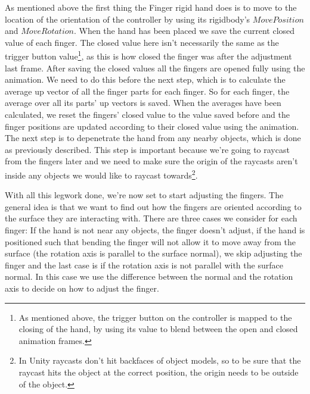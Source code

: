 As mentioned above the first thing the Finger rigid hand does is to move to the location of the orientation of the controller by using its rigidbody's $MovePosition$ and $MoveRotation$. When the hand has been placed we save the current closed value of each finger. The closed value here isn't necessarily the same as the trigger button value\footnote{As mentioned above, the trigger button on the controller is mapped to the closing of the hand, by using its value to blend between the open and closed animation frames.}, as this is how closed the finger was after the adjustment last frame. After saving the closed values all the fingers are opened fully using the animation. We need to do this before the next step, which is to calculate the average up vector of all the finger parts for each finger. So for each finger, the average over all its parts' up vectors is saved. When the averages have been calculated, we reset the fingers' closed value to the value saved before and the finger positions are updated according to their closed value using the animation. The next step is to depenetrate the hand from any nearby objects, which is done as previously described. This step is important because we're going to raycast from the fingers later and we need to make sure the origin of the raycasts aren't inside any objects we would like to raycast towards\footnote{In Unity raycasts don't hit backfaces of object models, so to be sure that the raycast hits the object at the correct position, the origin needs to be outside of the object.}. 

With all this legwork done, we're now set to start adjusting the fingers. The general idea is that we want to find out how the fingers are oriented according to the surface they are interacting with. There are three cases we consider for each finger: If the hand is not near any objects, the finger doesn't adjust, if the hand is positioned such that bending the finger will not allow it to move away from the surface (the rotation axis is parallel to the surface normal), we skip adjusting the finger and the last case is if the rotation axis is not parallel with the surface normal. In this case we use the difference between the normal and the rotation axis to decide on how to adjust the finger.

